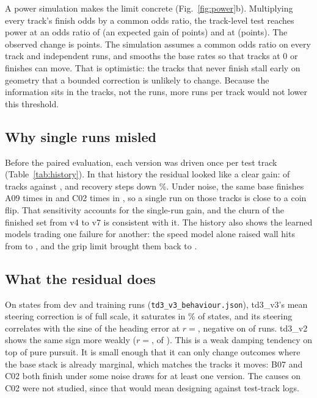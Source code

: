 \documentclass[conference]{IEEEtran}
\newcommand{\vseven}{v7\xspace}
\begin{document}
A power simulation makes the limit concrete (Fig.~\ref{fig:power}b). Multiplying every track's finish odds by
a common odds ratio, the track-level test reaches power \PowerLo at an odds ratio of \PowerLoOR (an expected
gain of \PowerLoGain points) and \PowerHi at \PowerHiOR (\PowerHiGain points). The observed change is
\FinDiff points. The simulation assumes a common odds ratio on every track and independent runs, and smooths
the base rates so that tracks at 0 or \RunsPerMap finishes can move. That is optimistic: the tracks that never
finish stall early on geometry that a bounded correction is unlikely to change. Because the information sits
in the tracks, not the runs, more runs per track would not lower this threshold.

\subsection{Why single runs misled}

Before the paired evaluation, each version was driven once per test track (Table~\ref{tab:history}). In that
history the residual looked like a clear gain: \SingleVeightFin of \NTest tracks against \SingleVsevenFin,
and recovery steps down \SingleRecDropPct\%. Under noise, the same base finishes A09 \AnineBase times in \RunsPerMap
and C02 \CtwoBase times in \RunsPerMap, so a single run on those tracks is close to a coin flip. That sensitivity
accounts for the single-run gain, and the churn of the finished set from v4 to \vseven is consistent with
it. The history also shows the learned models trading one failure for another: the speed model alone raised
wall hits from \SingleWallsVfour to \SingleWallsVfive, and the grip limit brought them back to \SingleWallsVsix.

\begin{table}[t]
\caption{Single deterministic run per held-out track, in the order the components were added. $t/t_{\mathrm{pro}}$:
median finish time over the pro's, over finished tracks.}
\label{tab:history}
\centering
\footnotesize

\end{table}

\subsection{What the residual does}

On \BehStates states from dev and training runs (\texttt{td3\_v3\_behaviour.json}), td3\_v3's mean steering
correction is \BehVthreeSteerA of full scale, it saturates in \BehVthreeSat\% of states, and its steering
correlates with the sine of the heading error at $r={}$\BehVthreeR, negative on \BehVthreeNeg of \BehRuns runs.
td3\_v2 shows the same sign more weakly ($r={}$\BehVtwoR, \BehVtwoNeg of \BehRuns). This is a weak damping
tendency on top of pure pursuit. It is small enough that it can only change outcomes where the base stack is
already marginal, which matches the tracks it moves: B07 and C02 both finish under some noise draws for at
least one version. The causes on C02 were not studied, since that would mean designing against test-track
logs.
\end{document}
